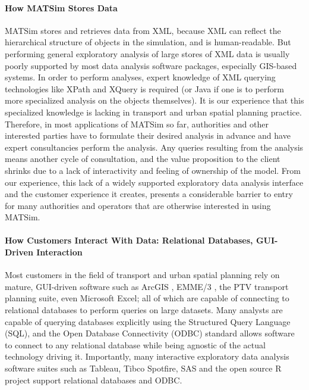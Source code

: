 \paragraph{How MATSim Stores Data}
MATSim stores and retrieves data from XML, because XML can reflect the hierarchical structure of objects in the simulation, and is human-readable. But performing general exploratory analysis of large stores of XML data is usually poorly supported by most data analysis software packages, especially GIS-based systems. In order to perform analyses, expert knowledge of XML querying technologies like XPath and XQuery is required (or Java if one is to perform more specialized analysis on the objects themselves).  It is our experience that this specialized knowledge is lacking in transport and urban spatial planning practice. Therefore, in most applications of MATSim so far, authorities and other interested parties have to formulate their desired analysis in advance and have expert consultancies perform the analysis. Any queries resulting from the analysis means another cycle of consultation, and the value proposition to the client shrinks due to a lack of interactivity and feeling of ownership of the model. From our experience, this lack of a widely supported exploratory data analysis interface and the customer experience it creates, presents a considerable barrier to entry for many authorities and operators that are otherwise interested in using MATSim.

\paragraph{How Customers Interact With Data: Relational Databases, GUI-Driven Interaction}
Most customers in the field of transport and urban spatial planning rely on mature, GUI-driven software such as ArcGIS \citep{ARC_GIS_2011}, EMME/3 \citep{EMME_Webpage_2015}, the PTV \citep{PTV_Webpage_2009} transport planning suite, even Microsoft Excel; all of which are capable of connecting to relational databases to perform queries on large datasets. Many analysts are capable of querying databases explicitly using the Structured Query Language (SQL), and the Open Database Connectivity (ODBC) standard allows software to connect to any relational database while being agnostic of the actual technology driving it. Importantly, many interactive exploratory data analysis software suites such as Tableau, Tibco Spotfire,  SAS and the open source R project support relational databases and ODBC.

